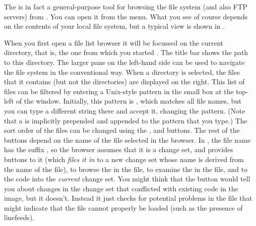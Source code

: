 \documentclass[a4paper,10pt,twoside]{book}
\begin{document}
The  is in fact a general-purpose tool for browsing the file system (and also FTP servers) from \pharo. 
You can open it from the  menu.
What you see of course depends on the contents of your local file system, but a typical view is shown in .

When you first open a file list browser it will be focussed on the current directory, that is, the one from which you started \pharo. The title bar shows the path to this directory.
The larger pane on the left-hand side can be used to navigate the file system in the conventional way.
When a directory is selected, the files that it contains (but not the directories) are displayed on the right.
This list of files can be filtered by entering a Unix-style pattern in the small box at the top-left of the window.  
Initially, this pattern is \ct{*}, which matches all file names, but you can type a different string there and accept it, changing the pattern.  (Note that a \ct{*} is implicitly prepended and appended to the pattern that you type.)
The sort order of the files can be changed using the ,  and  buttons.
The rest of the buttons depend on the name of the file selected in the browser.
In , the file name has the suffix , so the browser assumes that it is a change set, and provides buttons to  it (which \textit{files it in} to a new change set whose name is derived from the name of the file),  to browse the  in the file, to examine the  in the file, 
and to  the code into the \emph{current} change set.
You might think that the  button would tell you about changes in the change set that conflicted with existing code in the image, but it doesn't.
Instead it just checks for potential problems in the file that might indicate that the file cannot properly be loaded (such as the presence of linefeeds).
\end{document}
